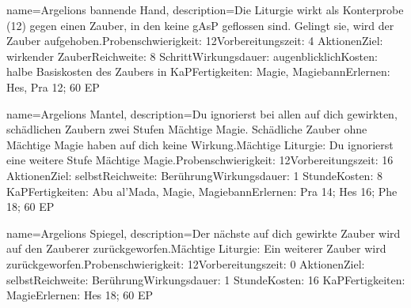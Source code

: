 {
    name={Argelions bannende Hand},
    description={Die Liturgie wirkt als Konterprobe (12) gegen einen Zauber, in den keine gAsP geflossen sind. Gelingt sie, wird der Zauber aufgehoben.\newline Probenschwierigkeit: 12\newline Vorbereitungszeit: 4 Aktionen\newline Ziel: wirkender Zauber\newline Reichweite: 8 Schritt\newline Wirkungsdauer: augenblicklich\newline Kosten: halbe Basiskosten des Zaubers in KaP\newline Fertigkeiten: Magie, Magiebann\newline Erlernen: Hes, Pra 12; 60 EP}
}


{
    name={Argelions Mantel},
    description={Du ignorierst bei allen auf dich gewirkten, schädlichen Zaubern zwei Stufen Mächtige Magie. Schädliche Zauber ohne Mächtige Magie haben auf dich keine Wirkung.\newline Mächtige Liturgie: Du ignorierst eine weitere Stufe Mächtige Magie.\newline Probenschwierigkeit: 12\newline Vorbereitungszeit: 16 Aktionen\newline Ziel: selbst\newline Reichweite: Berührung\newline Wirkungsdauer: 1 Stunde\newline Kosten: 8 KaP\newline Fertigkeiten: Abu al'Mada, Magie, Magiebann\newline Erlernen: Pra 14; Hes 16; Phe 18; 60 EP}
}


{
    name={Argelions Spiegel},
    description={Der nächste auf dich gewirkte Zauber wird auf den Zauberer zurückgeworfen.\newline Mächtige Liturgie: Ein weiterer Zauber wird zurückgeworfen.\newline Probenschwierigkeit: 12\newline Vorbereitungszeit: 0 Aktionen\newline Ziel: selbst\newline Reichweite: Berührung\newline Wirkungsdauer: 1 Stunde\newline Kosten: 16 KaP\newline Fertigkeiten: Magie\newline Erlernen: Hes 18; 60 EP}
}


